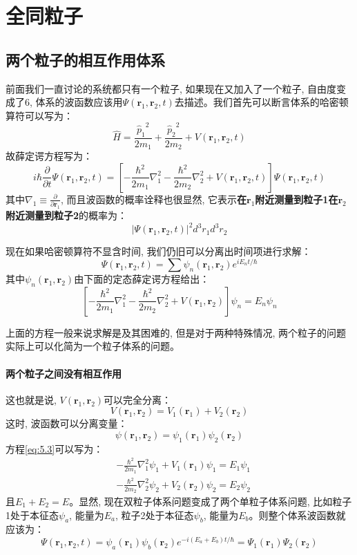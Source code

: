 \chapter{全同粒子}
\section{两个粒子的相互作用体系}
前面我们一直讨论的系统都只有一个粒子, 如果现在又加入了一个粒子, 自由度变成了$6$, 体系的波函数应该用$\Psi(\mathbf{r}_1,\mathbf{r}_2,t)$去描述。我们首先可以断言体系的哈密顿算符可以写为：
\[\hat{H}=\frac{{\hat{p}_1}^2}{2m_1}+\frac{{\hat{p}_2}^2}{2m_2}+V(\mathbf{r}_1,\mathbf{r}_2,t)\]
故薛定谔方程写为：
\begin{equation}
    i\hbar\frac{\partial }{\partial t}\Psi(\mathbf{r}_1,\mathbf{r}_2,t)=\left[-\frac{\hbar^2}{2m_1}\nabla_1^2-\frac{\hbar^2}{2m_2}\nabla_2^2+V(\mathbf{r}_1,\mathbf{r}_2,t)\right]\Psi(\mathbf{r}_1,\mathbf{r}_2,t)
\end{equation}
其中$\nabla_1\equiv\frac{\partial}{\partial\mathbf{r}_1}$, 而且波函数的概率诠释也很显然, 它表示\textbf{在$\mathbf{r}_1$附近测量到粒子1在$\mathbf{r}_2$附近测量到粒子2}的概率为：
\begin{equation}
    \left|\Psi(\mathbf{r}_1,\mathbf{r}_2,t)\right|^2d^3r_1d^3r_2
\end{equation}

现在如果哈密顿算符不显含时间, 我们仍旧可以分离出时间项进行求解：
\[\Psi(\mathbf{r}_1,\mathbf{r}_2,t)=\sum\psi_n(\mathbf{r}_1,\mathbf{r}_2)e^{iE_nt/\hbar}\]
其中$\psi_n(\mathbf{r}_1,\mathbf{r}_2)$由下面的定态薛定谔方程给出：
\begin{equation}
    \label{eq:5.3}
    \left[-\frac{\hbar^2}{2m_1}\nabla_1^2-\frac{\hbar^2}{2m_2}\nabla_2^2+V(\mathbf{r}_1,\mathbf{r}_2)\right]\psi_n=E_n\psi_n
\end{equation}

上面的方程一般来说求解是及其困难的, 但是对于两种特殊情况, 两个粒子的问题实际上可以化简为一个粒子体系的问题。
\subsubsection*{两个粒子之间没有相互作用}
这也就是说, $V(\mathbf{r}_1,\mathbf{r}_2)$可以完全分离：
\[V(\mathbf{r}_1,\mathbf{r}_2)=V_1(\mathbf{r}_1)+V_2(\mathbf{r}_2)\]
这时, 波函数可以分离变量：
\[\psi(\mathbf{r}_1,\mathbf{r}_2)=\psi_1(\mathbf{r}_1)\psi_2(\mathbf{r}_2)\]
方程\ref{eq:5.3}可以写为：
\begin{align*}
    &-\frac{\hbar^2}{2m_1}\nabla_1^2\psi_1+V_1(\mathbf{r}_1)\psi_1=E_1\psi_1\\
    &-\frac{\hbar^2}{2m_2}\nabla_2^2\psi_2+V_2(\mathbf{r}_2)\psi_2=E_2\psi_2
\end{align*}
且$E_1+E_2=E$。显然, 现在双粒子体系问题变成了两个单粒子体系问题, 比如粒子1处于本征态$\psi_a$, 能量为$E_a$, 粒子2处于本征态$\psi_b$, 能量为$E_b$。则整个体系波函数就应该为：
\[\Psi\left(\mathbf{r}_{1}, \mathbf{r}_{2}, t\right)=\psi_{a}\left(\mathbf{r}_{1}\right) \psi_{b}\left(\mathbf{r}_{2}\right) e^{-i\left(E_{a}+E_{b}\right) t / \hbar}
=\Psi_1(\mathbf{r}_{1})\Psi_2(\mathbf{r}_{2})\]


